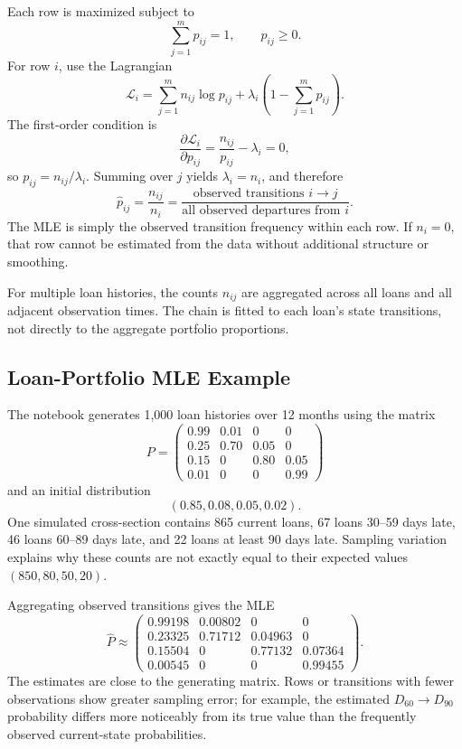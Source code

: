 \documentclass[12pt,openany]{book}
\theoremstyle{definition}
\theoremstyle{remark}
\begin{document}
Each row is maximized subject to
\[
\sum_{j=1}^{m}p_{ij}=1,
\qquad
p_{ij}\geq0.
\]
For row \(i\), use the Lagrangian
\[
\mathcal{L}_i
=\sum_{j=1}^{m}n_{ij}\log p_{ij}
+\lambda_i\left(1-\sum_{j=1}^{m}p_{ij}\right).
\]
The first-order condition is
\[
\frac{\partial\mathcal{L}_i}{\partial p_{ij}}
=\frac{n_{ij}}{p_{ij}}-\lambda_i=0,
\]
so \(p_{ij}=n_{ij}/\lambda_i\). Summing over \(j\) yields
\(\lambda_i=n_i\), and therefore
\[
\boxed{
\widehat p_{ij}
=\frac{n_{ij}}{n_i}
=\frac{\text{observed transitions }i\to j}
       {\text{all observed departures from }i}
}.
\]
The MLE is simply the observed transition frequency within each row. If
\(n_i=0\), that row cannot be estimated from the data without additional
structure or smoothing.

For multiple loan histories, the counts \(n_{ij}\) are aggregated across all
loans and all adjacent observation times. The chain is fitted to each loan's
state transitions, not directly to the aggregate portfolio proportions.

\subsection{Loan-Portfolio MLE Example}

The notebook generates 1,000 loan histories over 12 months using the matrix
\[
P=
\begin{pmatrix}
0.99&0.01&0&0\\
0.25&0.70&0.05&0\\
0.15&0&0.80&0.05\\
0.01&0&0&0.99
\end{pmatrix}
\]
and an initial distribution
\[
(0.85,0.08,0.05,0.02).
\]
One simulated cross-section contains 865 current loans, 67 loans 30--59 days
late, 46 loans 60--89 days late, and 22 loans at least 90 days late. Sampling
variation explains why these counts are not exactly equal to their expected
values \((850,80,50,20)\).

Aggregating observed transitions gives the MLE
\[
\widehat P\approx
\begin{pmatrix}
0.99198&0.00802&0&0\\
0.23325&0.71712&0.04963&0\\
0.15504&0&0.77132&0.07364\\
0.00545&0&0&0.99455
\end{pmatrix}.
\]
The estimates are close to the generating matrix. Rows or transitions with
fewer observations show greater sampling error; for example, the estimated
\(D_{60}\to D_{90}\) probability differs more noticeably from its true value
than the frequently observed current-state probabilities.
\end{document}
